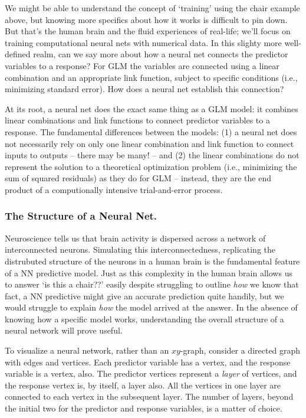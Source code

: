 \documentclass[12pt]{article}
\begin{document}
We might be able to understand the concept of `training' using the chair example above, but knowing more specifics about how it works is difficult 
to pin down.  But that's the human brain and the fluid experiences of real-life; we'll focus on training computational neural nets with numerical
data.  In this slighty more well-defined realm, can we say more about how a neural net connects the predictor variables to a response?  For GLM the 
variables are connected using a linear combination and an appropriate link function, subject to specific conditions (i.e., minimizing standard 
error).  How does a neural net establish this connection?

At its root, a neural net does the exact same thing as a GLM model: it combines linear combinations and link functions to connect predictor 
variables to a response.  The fundamental differences between the models: (1) a neural net does not necessarily rely on only one linear combination 
and link function to connect inputs to outputs -- there may be many! -- and (2) the linear combinations do not represent the solution to a 
theoretical optimization problem (i.e., minimizing the sum of squared residuals) as they do for GLM -- instead, they are the end product of a 
computionally intensive trial-and-error process.

\subsubsection{The Structure of a Neural Net.}
Neuroscience tells us that brain activity is dispersed across a network of interconnected neurons.  Simulating this interconnectedness, replicating
the distrubuted structure of the neurons in a human brain is the fundamental feature of a NN predictive model.  Just as this complexity in the
human brain allows us to answer `is this a chair??' easily despite struggling to outline \textit{how} we know that fact, a NN predictive might
give an accurate prediction quite handily, but we would struggle to explain \textit{how} the model arrived at the answer.  In the absence of 
knowing how a specific model works, understanding the overall structure of a neural network will prove useful.

To visualize a neural network, rather than an $xy$-graph, consider a directed graph with edges and vertices.  Each predictor variable has a vertex,
and the response variable is a vertex, also.  The predictor vertices represent a \textit{layer} of vertices, and the response vertex is, by itself,
a layer also.  All the vertices in one layer are connected to each vertex in the subsequent layer.  The number of layers, beyond the initial two
for the predictor and response variables, is a matter of choice.
\end{document}
